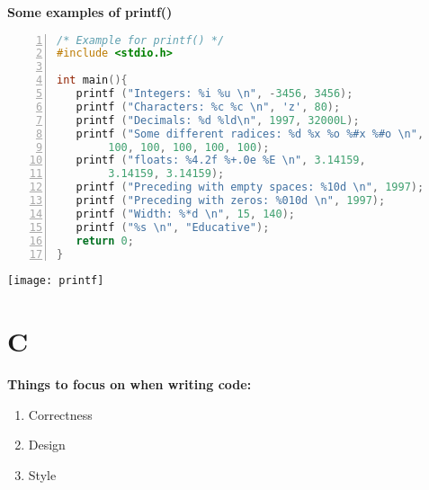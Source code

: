 \documentclass[12pt, letterpaper]{report}
\begin{document}
\textbf{Some examples of printf()}
\begin{lstlisting}[language=C,framexleftmargin=5mm,frame=single,xleftmargin=18pt,numbers=left,numberstyle=\tiny]
/* Example for printf() */
#include <stdio.h>

int main(){
   printf ("Integers: %i %u \n", -3456, 3456);
   printf ("Characters: %c %c \n", 'z', 80);
   printf ("Decimals: %d %ld\n", 1997, 32000L);
   printf ("Some different radices: %d %x %o %#x %#o \n", 
   		100, 100, 100, 100, 100);
   printf ("floats: %4.2f %+.0e %E \n", 3.14159, 
   		3.14159, 3.14159);
   printf ("Preceding with empty spaces: %10d \n", 1997);
   printf ("Preceding with zeros: %010d \n", 1997);
   printf ("Width: %*d \n", 15, 140);
   printf ("%s \n", "Educative");
   return 0;
}
\end{lstlisting}

\begin{center}
\texttt{[image: printf]}
\end{center}































\chapter{C}
\textbf{Things to focus on when writing code:}
\begin{enumerate}
	\item Correctness
	\item Design
	\item Style
\end{enumerate}
\end{document}
